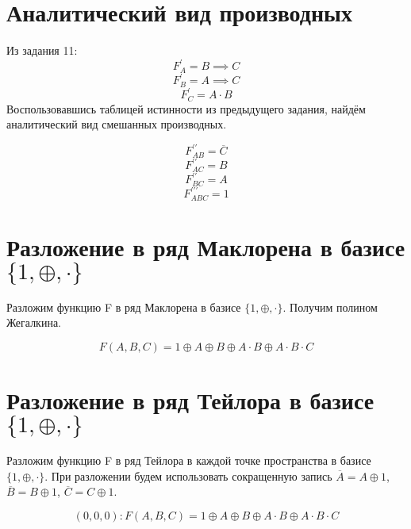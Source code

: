 \documentclass[a4paper,10pt]{article} %
\begin{document}
	\section{Аналитический вид производных}
	
	Из задания 11:
	\begin{equation}
		F_{A}^{\prime} = B \implies C
	\end{equation}
	\begin{equation}
		F_{B}^{\prime} = A \implies C
	\end{equation}
	\begin{equation}
		F_{C}^{\prime} = A \cdot B
	\end{equation}
	Воспользовавшись таблицей истинности из предыдущего задания, найдём аналитический вид смешанных производных.
	
	\begin{equation}
		F_{AB}^{\prime\prime} = \overline{C}
	\end{equation}
	\begin{equation}
		F_{AC}^{\prime\prime} = B
	\end{equation}
	\begin{equation}
		F_{BC}^{\prime\prime} = A
	\end{equation}
	\begin{equation}
		F_{ABC}^{\prime\prime\prime} = 1
	\end{equation}

	\section{Разложение в ряд Маклорена в базисе $\{1, \oplus, \cdot\}$}
	Разложим функцию F в ряд Маклорена в базисе $\{1, \oplus, \cdot\}$.
	Получим полином Жегалкина.
	
	\begin{equation}
		F(A, B, C) = 1 \oplus A \oplus B \oplus A \cdot B 
		\oplus A \cdot B\cdot C
	\end{equation}
	
	\section{Разложение в ряд Тейлора в базисе $\{1, \oplus, \cdot\}$}
	Разложим функцию F в ряд Тейлора в каждой точке пространства в базисе
	$\{1, \oplus, \cdot\}$. При разложении будем использовать сокращенную запись 
	$\overline{A} = A \oplus 1$, $\overline{B} = B \oplus 1$, 
	$\overline{C} = C \oplus 1$. 
	
	\begin{equation}
	(0, 0, 0): F(A, B, C) = 1 \oplus A \oplus B \oplus A \cdot B 
	\oplus A \cdot B\cdot C
	\end{equation}
	
\end{document}
